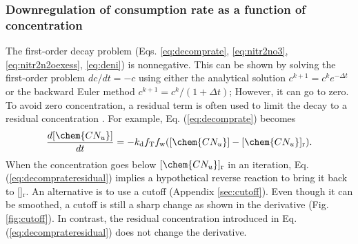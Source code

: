 \documentclass[gmd, manuscript]{copernicus}
\begin{document}
\subsubsection{Downregulation of consumption rate as a function of concentration}
The first-order decay problem (Eqs. \ref{eq:decomprate}, \ref{eq:nitr2no3},
\ref{eq:nitr2n2oexess}, \ref{eq:deni}) is nonnegative. This can be shown by
solving the first-order problem $dc/dt=-c$ using either the analytical solution
$c^{k+1} = c^k e^{-\Delta t}$ or the backward Euler method
$c^{k+1}=c^k/(1+\Delta t)$; %
However, it can go to zero. To avoid zero concentration, a residual term
is often used to limit the decay to a residual concentration \citep{Tang2013a}.
For example, Eq. (\ref{eq:decomprate}) becomes
\begin{equation}
\frac{d [\chem{CN_u}]}{d t} = -k_\text{d} f_\text{T} f_\text{w}
([\chem{CN_u}] - [\chem{CN_u}]_\text{r}).
\label{eq:decomprateresidual}
\end{equation}
When the concentration goes below $[\chem{CN_u}]_\text{r}$ in an
iteration, Eq. (\ref{eq:decomprateresidual}) implies a hypothetical reverse
reaction to bring it back to []$_\text{r}$. An alternative is to
use a cutoff (Appendix \ref{sec:cutoff}). Even though it
can be smoothed, a cutoff is still a sharp change as shown in the derivative (Fig. \ref{fig:cutoff}). In contrast, the residual
concentration introduced in Eq. (\ref{eq:decomprateresidual}) does not change
the derivative. %
\end{document}
